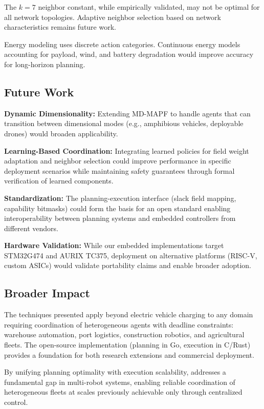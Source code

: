 The $k=7$ neighbor constant, while empirically validated, may not be optimal for all network topologies. Adaptive neighbor selection based on network characteristics remains future work.

Energy modeling uses discrete action categories. Continuous energy models accounting for payload, wind, and battery degradation would improve accuracy for long-horizon planning.

\subsection{Future Work}

\textbf{Dynamic Dimensionality:} Extending MD-MAPF to handle agents that can transition between dimensional modes (e.g., amphibious vehicles, deployable drones) would broaden applicability.

\textbf{Learning-Based Coordination:} Integrating learned policies for field weight adaptation and neighbor selection could improve performance in specific deployment scenarios while maintaining safety guarantees through formal verification of learned components.

\textbf{Standardization:} The planning-execution interface (slack field mapping, capability bitmasks) could form the basis for an open standard enabling interoperability between planning systems and embedded controllers from different vendors.

\textbf{Hardware Validation:} While our embedded implementations target STM32G474 and AURIX TC375, deployment on alternative platforms (RISC-V, custom ASICs) would validate portability claims and enable broader adoption.

\subsection{Broader Impact}

The techniques presented apply beyond electric vehicle charging to any domain requiring coordination of heterogeneous agents with deadline constraints: warehouse automation, port logistics, construction robotics, and agricultural fleets. The open-source implementation (planning in Go, execution in C/Rust) provides a foundation for both research extensions and commercial deployment.

By unifying planning optimality with execution scalability, \mapfhet{} addresses a fundamental gap in multi-robot systems, enabling reliable coordination of heterogeneous fleets at scales previously achievable only through centralized control.
